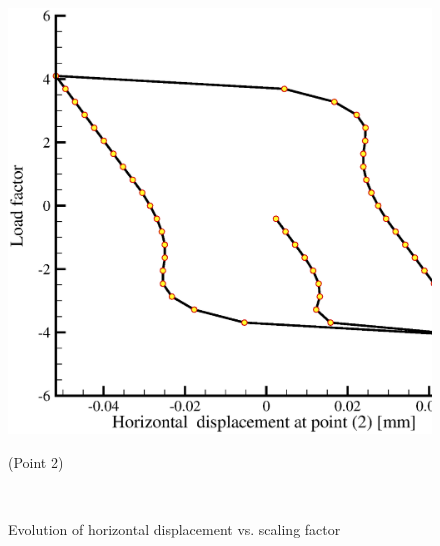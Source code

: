 \begin{figure}[!htb]
\begin{center}
\begin{minipage}[t]{0.48\textwidth}
\begin{center}
    \includegraphics[scale=0.28]{PART_II/M/ex1_load_v_ux_p2.eps}\\
    \centerline{(Point 2)}
    \end{center}
   \end{minipage}\\
  \end{center}
  \caption{Evolution of horizontal displacement vs. scaling factor}
  \label{Mp_ex2_loadp}
\end{figure}
